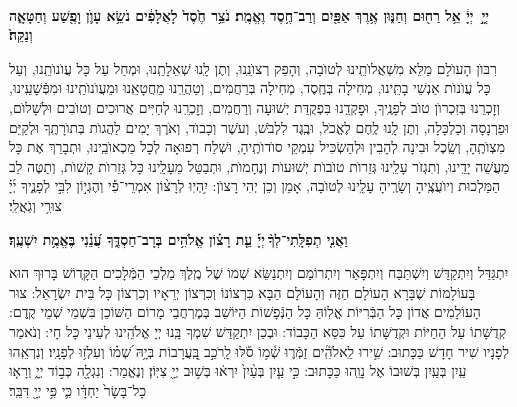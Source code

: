 \documentclass[twoside, openany, parskip=half, 11pt]{book}
\begin{document}




\pesicha

\begin{sometimes}

\\
 \textbf{יְיָ֣  יְיָ֔ אֵ֥ל רַח֖וּם וְחַנּ֑וּן אֶ֥רֶךְ אַפַּ֖יִם וְרַב־חֶ֥סֶד וֶאֱמֶֽת׃ נֹצֵ֥ר חֶ֙סֶד֙ לָאֲלָפִ֔ים נֹשֵׂ֥א עָוֺ֛ן וָפֶ֖שַׁע וְחַטָּאָ֑ה וְנַקֵּה֙׃}

רִבּוֺן הָעוׂלָם מַלֵּא מִשְׁאֲלוׂתֵֽינוּ לְטוׂבָה, וְהָפֵק רְצוׂנֵֽנוּ, וְתֶן לָֽנוּ שְׁאֵלָתֵֽנוּ, וּמְחַל עַל כָּל עֲוׂנוׂתֵֽנוּ, וְעַל כָּל עֲוׂנוׂת אַנְשֵׁי בָתֵּֽינוּ, מְחִילָה בְּחֶֽסֶד, מְחִילָה בְּרַחֲמִים,  וְטַהֲרֵֽנוּ מֵחֲטָאֵֽנוּ וּמֵעֲוׂנוׂתֵֽינוּ וּמִפְּֿשָׁעֵֽינוּ, וְזׇכְרֵנוּ בְּזִכְרוׂן טוׂב לְפָנֶֽיךָ, וּפׇקְדֵֽנוּ בִּפְקֻדַּת יְשׁוּעָה וְרַחֲמִים, וְזׇכְרֵֽנוּ לְחַיִּים אֲרוּכִים וְטוׂבִים וּלְשָׁלוׂם, וּפַרְנָסָה וְכַלְכָּלָה, וְתֶן לָֽנוּ לֶֽחֶם לֶאֱכׂל, וּבֶֽגֶד לִלְבּׂשׁ, וְעׂשֶׁר וְכָבוׂד, וְאׂרֶךְ יָמִים לַהֲגוׂת בְּתוׂרָתֶֽךָ וּלְקַיֵּם מִצְוׂתֶֽהָ, וְשֵֽׂכֶל וּבִינָה לְהָבִין וּלְהַשְׂכִּיל עִמְקֵי סוׂדוׂתֶֽיהָ, וּשְׁלַח רְפוּאָה לְכָל מַכְאוׂבֵֽינוּ, וּתְבָרֵךְ אֶת כָּל מַעֲשֵׁה יָדֵֽינוּ, וְתִגְזׂר עָלֵֽינוּ גְּזֵרוׂת טוׂבוׂת יְשׁוּעוׂת וְנֶחָמוׂת, וּתְבַטֵּל מֵעָלֵֽינוּ כָּל גְּזֵרוׂת קָשׁוׂת, וְתַטֶּה לֵב הַמַּלְכוּת וְיוׂעֲצֶֽיהָ וְשָׂרֶֽיהָ עָלֵֽינוּ לְטוׂבָה, אָמֵן וְכֵן יְהִי רָצוׂן:
%
 יִ֥הְיֽוּ לְרָצ֨וֹן אִמְרֵי־פִ֡י וְהֶגְי֣וֹן לִבִּ֣י לְפָנֶ֑יךָ יְ֜יָ֗ צוּרִ֥י וְגֹֽאֲלִֽי׃


\textbf{וַאֲנִ֤י תְפִלָּֽתִי־לְךָ֨ יְיָ֡ עֵ֤ת רָצ֗וֹן אֱלֹהִ֥ים בְּרָב־חַסְדֶּ֑ךָ עֲ֝נֵ֗נִי בֶּאֱמֶ֥ת יִשְׁעֶֽךָ׃}

\end{sometimes}

\gadlu

\label{al hakol}
יִתְגַּדַּל וְיִתְקַדַּשׁ וְיִשְׁתַּבַּח וְיִתְפָּאַר וְיִתְרוֹמַם וְיִתְנַשֵּׂא שְׁמוֹ שֶׁל מֶֽלֶךְ מַלְכֵי הַמְּֿלָכִים הַקְָּדוֹשׁ בָּרוּךְ הוּא בָּעוֹלָמוֹת שֶׁבָּרָא הָעוֹלָם הַזֶּה וְהָעוֹלָם הַבָּא כִּרְצוֹנוֹ וְכִרְצוֹן יְרֵאָיו וְכִרְצוֹן כָּל בֵּית יִשְׂרָאֵל: צוּר הָעוֹלָמִים אֲדוֹן כָּל הַבְּֿרִיּוֹת אֱלֽוֹהַּ כָּל הַנְּֿפָשׁוֹת הַיּוֹשֵׁב בְּמֶרְחֲבֵי מָרוֹם הַשּׁוֹכֵן בִּשְׁמֵי שְׁמֵי קֶֽדֶם: קְדֻשָּׁתוֹ עַל הַחַיּוֹת וּקְדֻשָּׁתוֹ עַל כִּסֵּא הַכָּבוֹד: וּבְכֵן יִתְקַדַּשׁ שִׁמְךָ בָּֽנוּ יְיָ אֱלֹהֵֽינוּ לְעֵינֵי כָּל חָי: וְנֹאמַר לְפָנָיו שִׁיר חָדָשׁ כַּכָּתוּב:
 שִׁ֥ירוּ לֵֽאלֹהִֽ֘ים זַמְּֿר֢וּ שְׁ֫מ֥וֹ סֹ֡לּוּ לָֽרֹכֵ֣ב בָּֽ֭עֲרָבוֹת בְּיָ֥הּ שְׁ֝מ֗וֹ וְעִלְז֥וּ לְפָנָֽיו׃ וְנִרְאֵֽהוּ עַֽיִן בְּעַֽיִן בְּשׁוּבוֹ אֶל נָוֵֽהוּ כַּכָּתוּב:
%
  כִּ֣י עַ֤יִן בְּעַ֨יִן֙ יִרְא֔וּ בְּשׁ֥וּב יְיָ֖ צִיּֽוֹן׃ וְנֶאֱמַר:
וְנִגְלָ֖ה כְּב֣וֹד יְיָ֑ וְרָא֤וּ כָל־בָּשָׂר֙ יַחְדָּ֔ו כִּ֛י פִּ֥י יְיָ֖ דִּבֵּֽר׃
\end{document}
